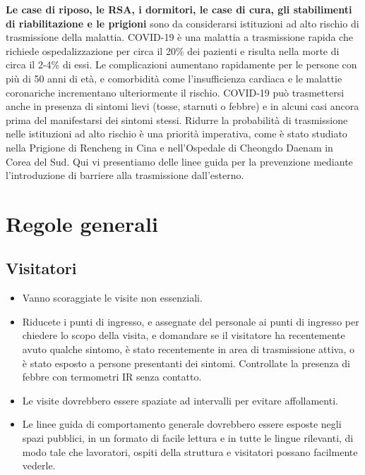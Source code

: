 \documentclass[onecolumn,journal]{IEEEtran}
\begin{document}
\begin{multicols}{2}

\textbf{Le case di riposo, le RSA, i dormitori, le case di cura, gli stabilimenti di riabilitazione e le prigioni} sono da considerarsi istituzioni ad alto rischio di trasmissione della malattia. COVID-19 è una malattia a trasmissione rapida che richiede ospedalizzazione per circa il 20\% dei pazienti e risulta nella morte di circa il 2-4\% di essi. Le complicazioni aumentano rapidamente per le persone con più di 50 anni di età, e comorbidità come l’insufficienza cardiaca e le malattie coronariche incrementano ulteriormente il rischio. COVID-19 può trasmettersi anche in presenza di sintomi lievi (tosse, starnuti o febbre) e in alcuni casi ancora prima del manifestarsi dei sintomi stessi. Ridurre la probabilità di trasmissione nelle istituzioni ad alto rischio è una priorità imperativa, come è stato studiato nella Prigione di Rencheng in Cina e nell’Ospedale di Cheongdo Daenam in Corea del Sud. Qui vi presentiamo delle linee guida per la prevenzione mediante l’introduzione di barriere alla trasmissione dall’esterno.



\section*{Regole generali}

\subsection*{Visitatori}

\begin{itemize}

\item Vanno scoraggiate le visite non essenziali.

\item {Riducete i punti di ingresso, e assegnate del personale ai punti di ingresso per chiedere lo scopo della visita, e domandare se il visitatore ha recentemente avuto qualche sintomo, è stato recentemente in area di trasmissione attiva, o è stato esposto a persone presentanti dei sintomi. Controllate la presenza di febbre con termometri IR senza contatto.}

\item Le visite dovrebbero essere spaziate ad intervalli per evitare affollamenti.

\item Le linee guida di comportamento generale dovrebbero essere esposte negli spazi pubblici, in un formato di facile lettura e in tutte le lingue rilevanti, di modo tale che lavoratori, ospiti della struttura e visitatori possano facilmente vederle.


\end{itemize}
\end{multicols}
\end{document}
